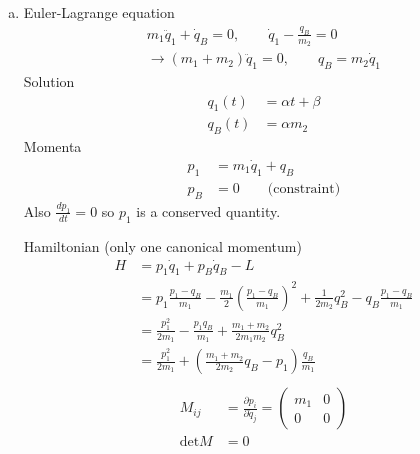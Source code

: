 \documentclass[10pt,a4paper]{report}
\theoremstyle{definition}
\begin{document}
\begin{enumerate}[a)]
\item Euler-Lagrange equation
\begin{align}
m_1\ddot{q}_1+\dot{q}_B=0,\qquad \dot{q}_1-\frac{q_B}{m_2}=0\\
\rightarrow (m_1+m_2)\ddot{q}_1=0,\qquad q_B=m_2\dot{q}_1
\end{align}
Solution
\begin{align}
q_1(t)&=\alpha t+\beta\\
q_B(t)&=\alpha m_2
\end{align}
Momenta
\begin{align}
p_1&=m_1\dot{q}_1+q_B\\
p_B&=0\qquad\text{(constraint)}
\end{align}
Also $\frac{dp_1}{dt}=0$ so $p_1$ is a conserved quantity.


Hamiltonian (only one canonical momentum)
\begin{align}
H&=p_1\dot{q}_1+p_B\dot{q}_B-L\\
&=p_1\frac{p_1-q_B}{m_1}-\frac{m_1}{2}\left(\frac{p_1-q_B}{m_1}\right)^2+\frac{1}{2m_2}q_B^2-q_B\frac{p_1-q_B}{m_1}\\
&=\frac{p_1^2}{2m_1}-\frac{p_1q_B}{m_1}+\frac{m_1+m_2}{2m_1m_2}q_B^2\\
&=\frac{p_1^2}{2m_1}+\left(\frac{m_1+m_2}{2m_2}q_B-p_1\right)\frac{q_B}{m_1}\\
\end{align}
\begin{align}
M_{ij}&=\frac{\partial p_i}{\partial \dot{q}_j}=\left(\begin{array}{cc}
m_1 & 0\\
0 & 0
\end{array}\right)\\
\text{det}M&=0
\end{align}

\end{enumerate}
\end{document}
